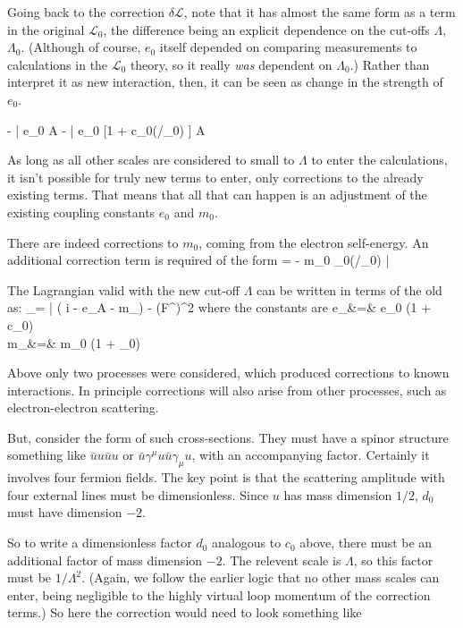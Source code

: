 Going back to the correction $\delta \mathcal{L}$, note that it has almost the same form as a term in the original $\mathcal{L}_0$, the difference being an explicit dependence on the cut-offs $\Lambda$, $\Lambda_0$.  (Although of course, $e_0$ itself depended on comparing measurements to calculations in the $\mathcal{L}_0$ theory, so it really {\it was} dependent on $\Lambda_0$.)  Rather than interpret it as new interaction, then, it can be seen as change in the strength of $e_0$.  

\beq
 - \bar{\Psi} e_0 A \cdot \gamma  \Psi \to - \bar{\Psi} e_0  [1 + c_0(\Lambda/\Lambda_0) ] A \cdot \gamma  \Psi
\eeq 

As long as all other scales are considered to small to $\Lambda$ to enter the calculations, it isn't possible for truly new terms to enter, only corrections to the already existing terms.  That means that all that can happen is an adjustment of the existing coupling constants $e_0$ and $m_0$.

There are indeed corrections to $m_0$, coming from the electron self-energy.  An additional correction term is required of the form
\beq
	\delta {} = - m_0  _0(\Lambda/\Lambda_0) \bar{\Psi} \Psi
\eeq

The Lagrangian valid with the new cut-off $\Lambda$ can be written in terms of the old as:
\beq
	_\Lambda = 
		\bar{\Psi} \left( i \partial \cdot \gamma - e_\Lambda A \cdot \gamma - m_\Lambda \right) \Psi -  (F^{\mu\nu})^2 
\eeq 
where the constants are
\beqa
	e_\Lambda &=& e_0 (1 + c_0)				\\
	m_\Lambda &=& m_0 (1 + _0)
\eeqa


Above only two processes were considered, which produced corrections to known interactions.  In principle corrections will also arise from other processes, such as electron-electron scattering.

But, consider the form of such cross-sections.  They must have a spinor structure something like $\bar{u}u \bar{u} u$ or $\bar{u}\gamma^\mu u \bar{u} \gamma_\mu u$, with an accompanying factor.  Certainly it involves four fermion fields.  The key point is that the scattering amplitude with four external lines must be dimensionless.  Since $u$ has mass dimension $1/2$, $d_0$ must have dimension $-2$.  

So to write a dimensionless factor $d_0$ analogous to $c_0$ above, there must be an additional factor of mass dimension $-2$.  The relevent scale is $\Lambda$, so this factor must be $1/\Lambda^2$.  (Again, we follow the earlier logic that no other mass scales can enter, being negligible to the highly virtual loop momentum of the correction terms.)  So here the correction would need to look something like

